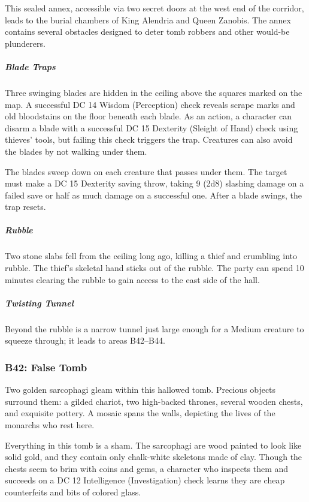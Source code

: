 \documentclass[10pt,a4paper,twoside,bg=print,twocolumn,openany,nodeprecatedcode]{dndbook}
\begin{document}
This sealed annex, accessible via two secret doors at the west end of the corridor, leads to the burial chambers of King Alendria and Queen Zanobis. The annex contains several obstacles designed to deter tomb robbers and other would-be plunderers.

\subparagraph{Blade Traps}
Three swinging blades are hidden in the ceiling above the squares marked on the map. A successful DC 14 Wisdom (Perception) check reveals scrape marks and old bloodstains on the floor beneath each blade. As an action, a character can disarm a blade with a successful DC 15 Dexterity (Sleight of Hand) check using thieves' tools, but failing this check triggers the trap. Creatures can also avoid the blades by not walking under them.

The blades sweep down on each creature that passes under them. The target must make a DC 15 Dexterity saving throw, taking 9 (2d8) slashing damage on a failed save or half as much damage on a successful one. After a blade swings, the trap resets.

\subparagraph{Rubble}
Two stone slabs fell from the ceiling long ago, killing a thief and crumbling into rubble. The thief's skeletal hand sticks out of the rubble. The party can spend 10 minutes clearing the rubble to gain access to the east side of the hall.

\subparagraph{Twisting Tunnel}
Beyond the rubble is a narrow tunnel just large enough for a Medium creature to squeeze through; it leads to areas B42–B44.

\subsubsection{B42: False Tomb}
\begin{DndReadAloud}{}
Two golden sarcophagi gleam within this hallowed tomb. Precious objects surround them: a gilded chariot, two high-backed thrones, several wooden chests, and exquisite pottery. A mosaic spans the walls, depicting the lives of the monarchs who rest here.

\end{DndReadAloud}

Everything in this tomb is a sham. The sarcophagi are wood painted to look like solid gold, and they contain only chalk-white skeletons made of clay. Though the chests seem to brim with coins and gems, a character who inspects them and succeeds on a DC 12 Intelligence (Investigation) check learns they are cheap counterfeits and bits of colored glass.
\end{document}
